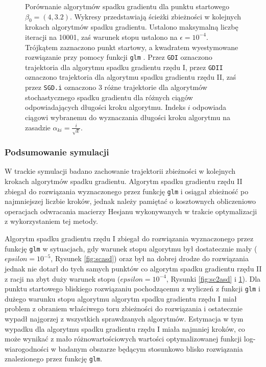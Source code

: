 \begin{figure}[hbt!]
  \caption[Porównanie algorytmów spadku gradientu dla punktu startowego $\beta_0 = (4,3.2)$.]{\label{fig:sc4asd}Porównanie algorytmów spadku gradientu dla punktu startowego $\beta_0 = (4,3.2)$. Wykresy przedstawiają ścieżki zbieżności w kolejnych krokach algorytmów spadku gradientu. Ustalono maksymalną liczbę iteracji na 10001, zaś warunek stopu ustalono na $\epsilon=10^{-4}$. Trójkątem zaznaczono punkt startowy, a kwadratem wyestymowane rozwiązanie przy pomocy funkcji \texttt{glm} \cite{glmglm}. Przez \texttt{GDI} oznaczono trajektoria dla algorytmu spadku gradientu rzędu I, przez \texttt{GDII} oznaczono trajektoria dla algorytmu spadku gradientu rzędu II, zaś przez \texttt{SGD.i} oznaczono 3 różne trajektorie dla algorytmów stochastycznego spadku gradientu dla różnych ciągów odpowiadających długości kroku algorytmu. Indeks $i$ odpowiada ciągowi wybranemu do wyznaczania długości kroku algorytmu na zasadzie $\alpha_{ki} = \frac{i}{\sqrt{k}}$.}
\end{figure}


\newpage

\subsubsection{Podsumowanie symulacji}
W trackie symulacji badano zachowanie trajektorii zbieżności w kolejnych krokach algorytmów spadku gradientu. Algorytm spadku gradientu rzędu II zbiegał do rozwiązania wyznaczonego przez funkcję \texttt{glm} \cite{glmglm} i osiągał zbieżność po najmniejszej liczbie kroków, jednak należy pamiętać o kosztownych obliczeniowo operacjach odwracania macierzy Hesjanu wykonywanych w trakcie optymalizacji z wykorzystaniem tej metody. 

Algorytm spadku gradientu rzędu I zbiegał do rozwiązania wyznaczonego przez funkcję \texttt{glm} w sytuacjach, gdy warunek stopu algorytmu był dostatecznie mały ($epsilon = 10^{-5}$, Rysunek \ref{fig:scasd}) oraz był na dobrej drodze do rozwiązania jednak nie dotarł do tych samych punktów co algorytm spadku gradientu rzędu II z racji na zbyt duży warunek stopu ($epsilon = 10^{-4}$, Rysunki \ref{fig:sc2asd} i \ref{fig:sc4asd}). Dla punktu startowego bliskiego rozwiązaniu pochodzącemu z wyliczeń z funkcji \texttt{glm} i dużego warunku stopu algorytmu algorytm spadku gradientu rzędu I miał problem z obraniem właściwego toru zbieżności do rozwiązania i ostatecznie wypadł najgorzej z wszystkich sprawdzanych algorytmów. Estymacja w tym wypadku dla algorytmu spadku gradientu rzędu I miała najmniej kroków, co może wynikać z mało różnowartościowych wartości optymalizowanej funkcji log-wiarogodności w badanym obszarze będącym stosunkowo blisko rozwiązania znalezionego przez funkcję \texttt{glm}.


